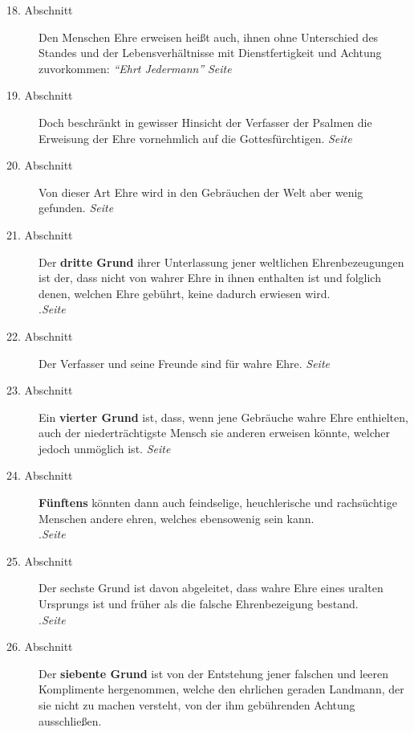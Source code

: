\begin{description}
\item[18. Abschnitt] Den Menschen Ehre erweisen heißt auch, ihnen ohne
Unterschied des Standes und der Lebensverhältnisse mit Dienstfertigkeit und
Achtung zuvorkommen: \textit{"`Ehrt Jedermann"'}
\dotfill \textit{Seite~\pageref{kap9_ab18}}\\
\item[19. Abschnitt] Doch beschränkt in gewisser Hinsicht der Verfasser der
Psalmen die Erweisung der Ehre vornehmlich auf die Gottesfürchtigen.
\dotfill \textit{Seite~\pageref{kap9_ab19}}\\
\item[20. Abschnitt] Von dieser Art Ehre wird in den Gebräuchen der Welt aber
wenig gefunden.
\dotfill \textit{Seite~\pageref{kap9_ab20}}\\
\item[21. Abschnitt] Der \textbf{dritte Grund} ihrer Unterlassung jener
weltlichen
Ehrenbezeugungen ist der, dass nicht von wahrer Ehre in ihnen enthalten ist und
folglich denen, welchen Ehre gebührt, keine dadurch erwiesen wird.\\
.\dotfill \textit{Seite~\pageref{kap9_ab21}}\\
\item[22. Abschnitt] Der Verfasser und seine Freunde sind für wahre Ehre.
\dotfill \textit{Seite~\pageref{kap9_ab22}}\\
\item[23. Abschnitt] Ein \textbf{vierter Grund} ist, dass, wenn jene Gebräuche
wahre Ehre
enthielten, auch der niederträchtigste Mensch sie anderen erweisen könnte,
welcher jedoch unmöglich ist.
\dotfill \textit{Seite~\pageref{kap9_ab23}}\\
\item[24. Abschnitt] \textbf{Fünftens} könnten dann auch feindselige,
heuchlerische und
rachsüchtige Menschen andere ehren, welches ebensowenig sein kann.\\
.\dotfill \textit{Seite~\pageref{kap9_ab24}}\\
\item[25. Abschnitt] Der sechste Grund ist davon abgeleitet, dass wahre Ehre
eines uralten Ursprungs ist und früher als die falsche Ehrenbezeigung bestand.\\
.\dotfill \textit{Seite~\pageref{kap9_ab25}}\\
\item[26. Abschnitt] Der \textbf{siebente Grund} ist von der Entstehung jener
falschen
und leeren Komplimente hergenommen, welche den ehrlichen geraden Landmann, der
sie nicht zu machen versteht, von der ihm gebührenden Achtung ausschließen.

\end{description}
